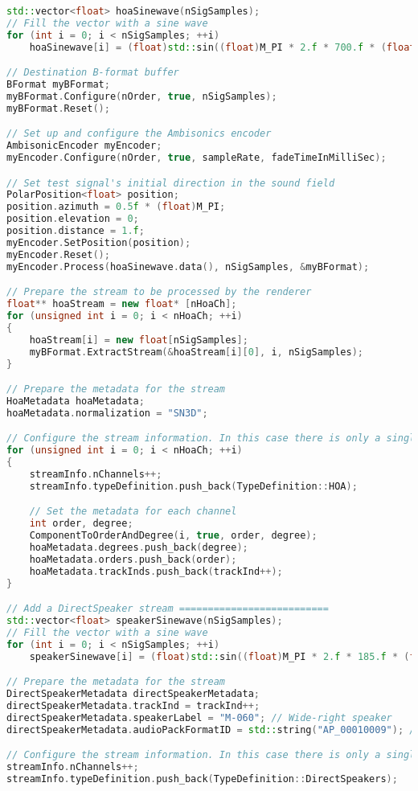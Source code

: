 \documentclass[12pt]{report}
\begin{document}
\begin{lstlisting}[language=C++]
std::vector<float> hoaSinewave(nSigSamples);
// Fill the vector with a sine wave
for (int i = 0; i < nSigSamples; ++i)
    hoaSinewave[i] = (float)std::sin((float)M_PI * 2.f * 700.f * (float)i / (float)sampleRate);

// Destination B-format buffer
BFormat myBFormat;
myBFormat.Configure(nOrder, true, nSigSamples);
myBFormat.Reset();

// Set up and configure the Ambisonics encoder
AmbisonicEncoder myEncoder;
myEncoder.Configure(nOrder, true, sampleRate, fadeTimeInMilliSec);

// Set test signal's initial direction in the sound field
PolarPosition<float> position;
position.azimuth = 0.5f * (float)M_PI;
position.elevation = 0;
position.distance = 1.f;
myEncoder.SetPosition(position);
myEncoder.Reset();
myEncoder.Process(hoaSinewave.data(), nSigSamples, &myBFormat);

// Prepare the stream to be processed by the renderer
float** hoaStream = new float* [nHoaCh];
for (unsigned int i = 0; i < nHoaCh; ++i)
{
    hoaStream[i] = new float[nSigSamples];
    myBFormat.ExtractStream(&hoaStream[i][0], i, nSigSamples);
}

// Prepare the metadata for the stream
HoaMetadata hoaMetadata;
hoaMetadata.normalization = "SN3D";

// Configure the stream information. In this case there is only a single HOA stream of (nOrder + 1)^2 channels
for (unsigned int i = 0; i < nHoaCh; ++i)
{
    streamInfo.nChannels++;
    streamInfo.typeDefinition.push_back(TypeDefinition::HOA);

    // Set the metadata for each channel
    int order, degree;
    ComponentToOrderAndDegree(i, true, order, degree);
    hoaMetadata.degrees.push_back(degree);
    hoaMetadata.orders.push_back(order);
    hoaMetadata.trackInds.push_back(trackInd++);
}

// Add a DirectSpeaker stream ==========================
std::vector<float> speakerSinewave(nSigSamples);
// Fill the vector with a sine wave
for (int i = 0; i < nSigSamples; ++i)
    speakerSinewave[i] = (float)std::sin((float)M_PI * 2.f * 185.f * (float)i / (float)sampleRate);

// Prepare the metadata for the stream
DirectSpeakerMetadata directSpeakerMetadata;
directSpeakerMetadata.trackInd = trackInd++;
directSpeakerMetadata.speakerLabel = "M-060"; // Wide-right speaker
directSpeakerMetadata.audioPackFormatID = std::string("AP_00010009"); // 9+10+3 layout

// Configure the stream information. In this case there is only a single channel stream
streamInfo.nChannels++;
streamInfo.typeDefinition.push_back(TypeDefinition::DirectSpeakers);


\end{lstlisting}
\end{document}
